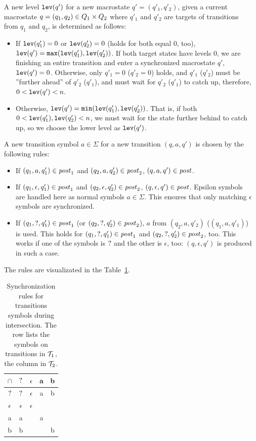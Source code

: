 A new level $\texttt{lev}(q')$ for a new macrostate $q' = (q'_1, q'_2)$, given a current macrostate $q = (q_1, q_2) \in Q_1 \times Q_2$ where $q'_1$ and $q'_2$ are targets of transitions from $q_1$ and $q_2$, is determined as follows:
\begin{itemize}
  \item If $\texttt{lev}(q'_1) = 0$ or $\texttt{lev}(q'_2) = 0$ (holds for both equal $0$, too), $\texttt{lev}(q') = \texttt{max}(\texttt{lev}(q'_1), \texttt{lev}(q'_2))$. If both target states have levels $0$, we are finishing an entire \nft transition and enter a synchronized macrostate $q'$, $\texttt{lev}(q') = 0$. Otherwise, only $q'_1 = 0$ ($q'_2 = 0$) holds, and $q'_1$ ($q'_2$) must be ''further ahead'' of $q'_2$ ($q'_1$), and must wait for $q'_2$ ($q'_1$) to catch up, therefore, $0 < \texttt{lev}(q') < n$.
  \item Otherwise, $\texttt{lev}(q') = \texttt{min}(\texttt{lev}(q'_1), \texttt{lev}(q'_2))$. That is, if both $0 < \texttt{lev}(q'_1), \texttt{lev}(q'_2) < n$, we must wait for the state further behind to catch up, so we choose the lower level as $\texttt{lev}(q')$.
\end{itemize}

A new transition symbol $a \in \Sigma$ for a new transition $(q, a, q')$ is chosen by the following rules:
\begin{itemize}
  \item If $(q_1, a, q'_1) \in \mathit{post}_1$ and $(q_2, a, q'_2) \in \mathit{post}_2$, $(q, a, q') \in \mathit{post}$.
  \item If $(q_1, \epsilon, q'_1) \in \mathit{post}_1$ and $(q_2, \epsilon, q'_2) \in \mathit{post}_2$, $(q, \epsilon, q') \in \mathit{post}$. Epsilon symbols are handled here as normal symbols $a \in \Sigma$. This ensures that only matching $\epsilon$ symbols are synchronized.
  \item If $(q_1, ?, q'_1) \in \mathit{post}_1$ (or $(q_2, ?, q'_2) \in \mathit{post}_2$), $a$ from $(q_2, a, q'_2)$ ($(q_1, a, q'_1)$) is used.
  This holds for $(q_1, ?, q'_1) \in \mathit{post}_1$ and $(q_2, ?, q'_2) \in \mathit{post}_2$, too.
  This works if one of the symbols is $?$ and the other is $\epsilon$, too: $(q, \epsilon, q')$ is produced in such a case.
\end{itemize}

The rules are visualizated in the Table~\ref{tab:synchronization_rules}.
\begin{table}[ht]
\centering
\begin{tabular}{ |c||c|c|c|c| }
 \hline
 $\cap$ & $?$ & $\epsilon$ & a & b \\
 \hline
 \hline
 $?$ & $?$ & $\epsilon$ & a & b \\
 \hline
 $\epsilon$ & $\epsilon$ & $\epsilon$ & & \\
 \hline
 a & a &  & a &\\
 \hline
 b & b &  & & b\\
 \hline
\end{tabular}
\caption{
  Synchronization rules for transitions symbols during intersection.
  The row lists the symbols on transitions in $\mathcal{T}_1$, the column in $\mathcal{T}_2$.
}
\label{tab:synchronization_rules}
\end{table}

